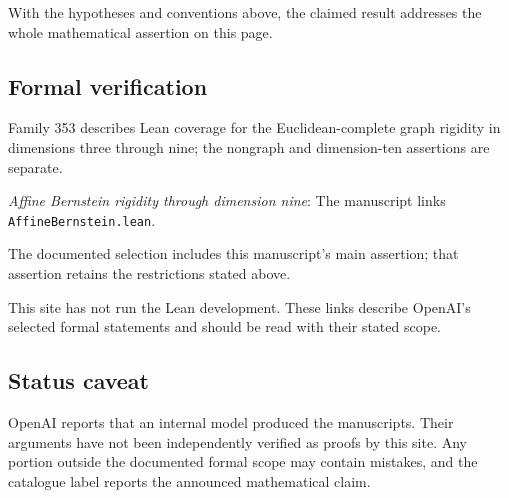 \documentclass[11pt]{article}
\begin{document}
With the hypotheses and conventions above, the claimed result addresses the whole mathematical assertion on this page.

\subsection{Formal verification}
Family 353 describes Lean coverage for the Euclidean-complete graph rigidity in dimensions three through nine; the nongraph and dimension-ten assertions are separate.

\textit{Affine Bernstein rigidity through dimension nine}: The manuscript links \texttt{AffineBernstein.lean}.

The documented selection includes this manuscript’s main assertion; that assertion retains the restrictions stated above.

This site has not run the Lean development. These links describe OpenAI’s selected formal statements and should be read with their stated scope.

\subsection{Status caveat}
OpenAI reports that an internal model produced the manuscripts. Their arguments have not been independently verified as proofs by this site. Any portion outside the documented formal scope may contain mistakes, and the catalogue label reports the announced mathematical claim.
\end{document}
